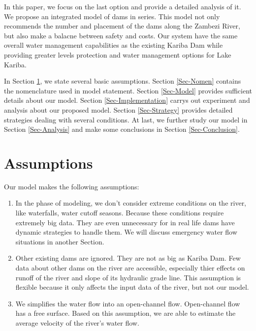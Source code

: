 \documentclass{mcmthesis}
\begin{document}
In this paper, we focus on the last option and provide a detailed analysis of it. We propose an integrated model of dams in series. This model not only recommends the number and placement of the dams along the Zambezi River, but also make a balacne between safety and costs. Our system have the same overall water management capabilities as the existing Kariba Dam while providing greater levels protection and water management options for Lake Kariba.

In Section \ref{Sec-Assume}, we state several basic assumptions. Section \ref{Sec-Nomen} contains the nomenclature used in model statement. Section \ref{Sec-Model} provides sufficient details about our model. Section \ref{Sec-Implementation} carrys out experiment and analysis about our proposed model. Section \ref{Sec-Strategy} provides detailed strategies dealing with several conditions. At last, we further study our model in Section \ref{Sec-Analysis} and make some conclusions in Section \ref{Sec-Conclusion}.
\section{Assumptions}\label{Sec-Assume}
Our model makes the following assumptions:
\begin{enumerate}
	\item In the phase of modeling, we don't consider extreme conditions on the river, like waterfalls, water cutoff seasons. Because these conditions require extremely big data. They are  even unnecessary for in real life dams have dynamic strategies to handle them. We will discuss emergency water flow situations in another Section.
	\item Other existing dams are ignored. They are not as big as Kariba Dam. Few data about other dams on the river are accessible, especially thier effects on runoff of the river and slope of its hydraulic grade line. This assumption is flexible because it only affects the input data of the river, but not our model.
	\item We simplifies the water flow into an open-channel flow. Open-channel flow has a free surface. Based on this assumption, we are able to estimate the average velocity of the river's water flow.
\end{enumerate}
\end{document}

